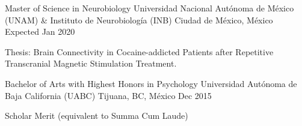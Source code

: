 \begin{cventries}
    \cventry
        {Master of Science in Neurobiology}
        {Universidad Nacional Autónoma de México (UNAM) \& Instituto de
        Neurobiología (INB)}
        {Ciudad de México, México}
        {Expected Jan 2020}
        {
            \begin{cvitems}
                \item {Thesis: Brain Connectivity in Cocaine-addicted Patients after Repetitive Transcranial Magnetic Stimulation Treatment.}
            \end{cvitems}
        }
    \cventry
        {Bachelor of Arts with Highest Honors in Psychology}
        {Universidad Autónoma de Baja California (UABC)}
        {Tijuana, BC, México}
        {Dec 2015}
        {
            \begin{cvitems}
                \item {Scholar Merit (equivalent to Summa Cum Laude)}
            \end{cvitems}
        }
\end{cventries}
